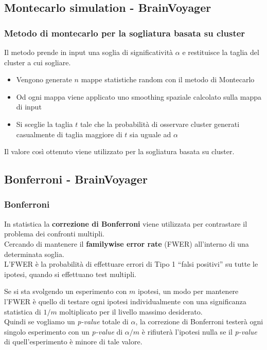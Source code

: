 \documentclass{beamer}
\begin{document}
\subsection{Montecarlo simulation - BrainVoyager}
\begin{frame}
\frametitle{Metodo di montecarlo per la sogliatura basata su cluster}
Il metodo prende in input una soglia di significatività $\alpha$ e restituisce la taglia del cluster a cui sogliare.
\begin{itemize}
\item Vengono generate $n$ mappe statistiche random con il metodo di Montecarlo
\item Od ogni mappa viene applicato uno smoothing spaziale calcolato sulla mappa di input
\item Si sceglie la taglia $t$ tale che la probabilità di osservare cluster generati casualmente di taglia maggiore di $t$ sia uguale ad $\alpha$
\end{itemize}
Il valore così ottenuto viene utilizzato per la sogliatura basata su cluster. 
\end{frame}

\subsection{Bonferroni - BrainVoyager}
\begin{frame}
\frametitle{Bonferroni}
In statistica la \textbf{correzione di Bonferroni} viene utilizzata per contrastare il problema dei confronti multipli.\\
\medskip
Cercando di mantenere il \textbf{familywise error rate} (FWER) all'interno di una determinata soglia.\\
\smallskip
L'FWER è la probabilità di effettuare errori di Tipo 1  ``falsi positivi'' su tutte le ipotesi, quando si effettuano test multipli.
\end{frame}

\begin{frame}
Se si sta svolgendo un esperimento con $m$ ipotesi, un modo per mantenere l'FWER  è quello di testare ogni ipotesi individualmente con una significanza statistica di $1/m$ moltiplicato per il livello massimo desiderato.\\
\medskip
Quindi se vogliamo un \textit{p-value} totale di $\alpha$, la correzione di Bonferroni testerà ogni singolo esperimento con un \textit{p-value} di $\alpha/m$ è rifiuterà l'ipotesi nulla se il \textit{p-value} di quell'esperimento è minore di tale valore.
\end{frame}
\end{document}
